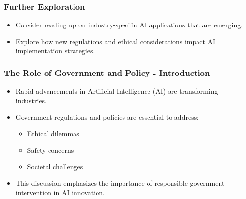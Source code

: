 \documentclass{beamer}
\begin{document}
\begin{frame}[fragile]
    \frametitle{Further Exploration}
    \begin{itemize}
        \item Consider reading up on industry-specific AI applications that are emerging.
        \item Explore how new regulations and ethical considerations impact AI implementation strategies.
    \end{itemize}
\end{frame}

\begin{frame}[fragile]
    \frametitle{The Role of Government and Policy - Introduction}
    \begin{itemize}
        \item Rapid advancements in Artificial Intelligence (AI) are transforming industries.
        \item Government regulations and policies are essential to address:
        \begin{itemize}
            \item Ethical dilemmas
            \item Safety concerns
            \item Societal challenges
        \end{itemize}
        \item This discussion emphasizes the importance of responsible government intervention in AI innovation.
    \end{itemize}
\end{frame}
\end{document}
